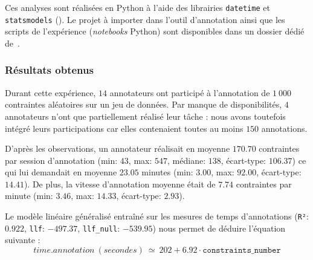 			\begin{leftBarInformation}
				Ces analyses sont réalisées en Python à l'aide des librairies \texttt{datetime} et \texttt{statsmodels} (\cite{seabold:2010}).
				Le projet à importer dans l'outil d'annotation ainsi que les scripts de l'expérience (\textit{notebooks} Python) sont disponibles dans un dossier dédié de~\cite{schild:cognitivefactory-interactive-clustering-comparative-study:2021}.
			\end{leftBarInformation}

		\subsubsection{Résultats obtenus}
		
			Durant cette expérience, $14$ annotateurs ont participé à l'annotation de $1~000$ contraintes aléatoires sur un jeu de données.
			Par manque de disponibilités, $4$ annotateurs n'ont que partiellement réalisé leur tâche : nous avons toutefois intégré leurs participations car elles contenaient toutes au moins $150$ annotations.
			
			D'après les observations, un annotateur réalisait en moyenne $170.70$ contraintes par session d'annotation (min: $43$, max: $547$, médiane: $138$, écart-type: $106.37$) ce qui lui demandait en moyenne $23.05$ minutes (min: $3.00$, max: $92.00$, écart-type: $14.41$).
			De plus, la vitesse d'annotation moyenne était de $7.74$ contraintes par minute (min: $3.46$, max: $14.33$, écart-type: $2.93$).
			
			Le modèle linéaire généralisé entraîné sur les mesures de temps d'annotations (\texttt{R²}: $0.922$, \texttt{llf}: $-497.37$, \texttt{llf\_null}: $-539.95$) nous permet de déduire l'équation suivante :
			\begin{equation}
				time.annotation~(secondes)~
				\simeq~202 + 6.92 \cdot \texttt{constraints\_number}
			\end{equation}
		
